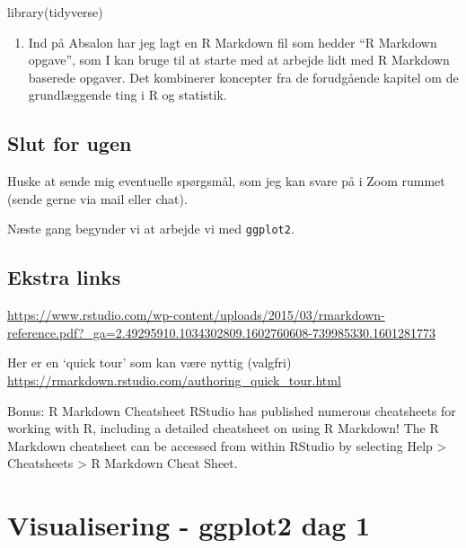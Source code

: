 \documentclass[
]{book}
\newenvironment{Shaded}{\begin{snugshade}}{\end{snugshade}}
\newcommand{\FunctionTok}[1]{\textcolor[rgb]{0.00,0.00,0.00}{#1}}
\newcommand{\NormalTok}[1]{#1}
\providecommand{\tightlist}{%
  \setlength{\itemsep}{0pt}\setlength{\parskip}{0pt}}
\begin{document}
\begin{Shaded}
\begin{Highlighting}[]
\FunctionTok{library}\NormalTok{(tidyverse)}
\end{Highlighting}
\end{Shaded}

\begin{enumerate}
\def\labelenumi{\arabic{enumi})}
\setcounter{enumi}{9}
\tightlist
\item
  Ind på Absalon har jeg lagt en R Markdown fil som hedder ``R Markdown opgave'', som I kan bruge til at starte med at arbejde lidt med R Markdown baserede opgaver. Det kombinerer koncepter fra de forudgående kapitel om de grundlæggende ting i R og statistik.
\end{enumerate}

\hypertarget{slut-for-ugen}{%
\section{Slut for ugen}\label{slut-for-ugen}}

Huske at sende mig eventuelle spørgsmål, som jeg kan svare på i Zoom rummet (sende gerne via mail eller chat).

Næste gang begynder vi at arbejde vi med \texttt{ggplot2}.

\hypertarget{ekstra-links}{%
\section{Ekstra links}\label{ekstra-links}}

\url{https://www.rstudio.com/wp-content/uploads/2015/03/rmarkdown-reference.pdf?_ga=2.49295910.1034302809.1602760608-739985330.1601281773}

Her er en `quick tour' som kan være nyttig (valgfri)
\url{https://rmarkdown.rstudio.com/authoring_quick_tour.html}

Bonus: R Markdown Cheatsheet
RStudio has published numerous cheatsheets for working with R, including a detailed cheatsheet on using R Markdown! The R Markdown cheatsheet can be accessed from within RStudio by selecting Help \textgreater{} Cheatsheets \textgreater{} R Markdown Cheat Sheet.

\hypertarget{visual1}{%
\chapter{Visualisering - ggplot2 dag 1}\label{visual1}}
\end{document}
